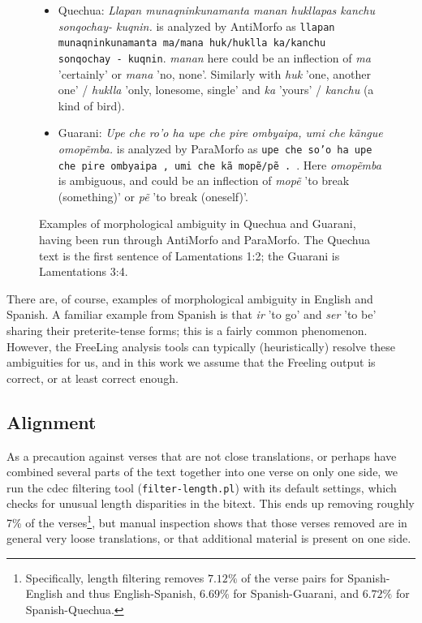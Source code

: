 \begin{figure}
\begin{itemize}
  \item Quechua: \emph{Llapan munaqninkunamanta manan hukllapas kanchu
  sonqochay- kuqnin.} is analyzed by AntiMorfo as \texttt{llapan
  munaqninkunamanta ma/mana huk/huklla ka/kanchu sonqochay - kuqnin}.
  \emph{manan} here could be an inflection of \emph{ma} 'certainly' or
  \emph{mana} 'no, none'. Similarly with \emph{huk} 'one, another one' /
  \emph{huklla} 'only, lonesome, single' and \emph{ka} 'yours' /
  \emph{kanchu} (a kind of bird).
  \item Guarani: \emph{Upe che ro'o ha upe che pire ombyaipa, umi che kãngue
  omopẽmba.} is analyzed by ParaMorfo as \texttt{upe
  che so'o ha upe che pire ombyaipa , umi che kã mopẽ/pẽ . }. Here
  \emph{omopẽmba} is ambiguous, and could be an inflection of \emph{mopẽ} 'to
  break (something)' or \emph{pẽ} 'to break (oneself)'.
\end{itemize}
\caption{Examples of morphological ambiguity in Quechua and Guarani,
having been run through AntiMorfo and ParaMorfo. The Quechua text is the first
sentence of Lamentations 1:2; the Guarani is Lamentations 3:4.}
\label{fig:gn-qu-morpho-ambiguity}
\end{figure}


There are, of course, examples of morphological ambiguity in English and
Spanish. A familiar example from Spanish is that \emph{ir} 'to
go' and \emph{ser} 'to be' sharing their preterite-tense forms; this is a
fairly common phenomenon. However, the FreeLing analysis tools can typically
(heuristically) resolve these ambiguities for us, and in this work we assume
that the Freeling output is correct, or at least correct enough.

\subsection{Alignment}
As a precaution against verses that are not close translations, or perhaps have
combined several parts of the text together into one verse on only one side, we
run the cdec filtering tool (\texttt{filter-length.pl}) with its default
settings, which checks for unusual length disparities in the bitext. This ends
up removing roughly 7\% of the verses\footnote{Specifically, length filtering
removes $7.12\%$ of the verse pairs for Spanish-English and thus
English-Spanish, $6.69\%$ for Spanish-Guarani, and $6.72\%$ for
Spanish-Quechua.}, but manual inspection shows that those verses removed are in
general very loose translations, or that additional material is present on one
side.

